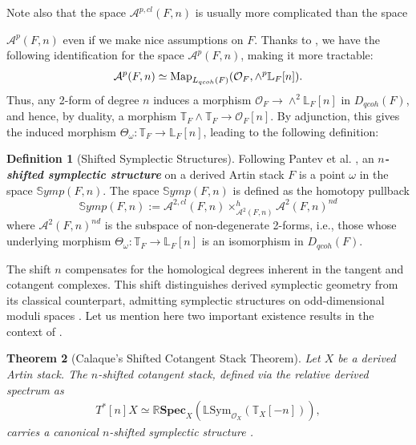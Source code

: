 \documentclass[reqno]{amsart}
\newtheorem{theorem}{Theorem}[section]
\theoremstyle{definition}
\newtheorem{definition}[theorem]{Definition}
\theoremstyle{remark}
\newcommand{\LL}{\mathbb{L}}
\newcommand{\TT}{\mathbb{T}}
\newcommand{\cO}{\mathcal{O}}
\newcommand{\bfem}[1]{\textbf{\textit{#1}}}
\begin{document}
Note also that the space $\mathcal{A}^{p,cl}(F,n)$  is usually more complicated than the space {$ \mathcal{A}^p(F,n)$  even if we make nice assumptions on $F$. Thanks to \cite[Prop.  1.14]{PTVV}, we have the following identification for the space $ \mathcal{A}^p(F,n)$, making it more tractable: 
\begin{equation*}
    \mathcal{A}^p(F,n)\simeq {\rm Map}_{L_{qcoh}(F)}(\mathcal{O}_F, \wedge^p\mathbb{L}_F[n]). 
\end{equation*}
 Thus, any 2-form of degree $n$  induces a morphism $\mathcal{O}_F \rightarrow  \wedge^2\mathbb{L}_F[n]$ in $D_{qcoh}(F)$, and hence, by duality, a morphism $\mathbb{T}_F \wedge \mathbb{T}_F \rightarrow \mathcal{O}_F[n]$. By adjunction, this gives the induced morphism $\Theta_{\omega} : \mathbb{T}_F \rightarrow \mathbb{L}_F [n]$, leading to the following definition:

\begin{definition}[Shifted Symplectic Structures]
  Following Pantev et al. \cite[Definition 1.18]{PTVV}, an
  \bfem{$n$-shifted symplectic structure} on a derived Artin stack
  $F$ is a point $\omega$ in the space $\mathbb{S}ymp(F, n)$. The
  space $\mathbb{S}ymp(F, n)$ is defined as the homotopy pullback
  \begin{equation*}
    \mathbb{S}ymp(F,n) := \mathcal{A}^{2,cl}(F,n)
    \times_{\mathcal{A}^2(F,n)}^h \mathcal{A}^2(F,n)^{nd}
  \end{equation*}
  where $\mathcal{A}^2(F,n)^{nd}$ is the subspace of non-degenerate
  2-forms, i.e., those whose underlying morphism $\Theta_{\omega}:
  \TT_F \to \LL_F[n]$ is an isomorphism in $D_{qcoh}(F)$.
\end{definition}

The shift $n$ compensates for the homological
degrees inherent in the tangent and cotangent complexes. This shift
distinguishes derived symplectic
geometry from its classical counterpart, admitting symplectic
structures on odd-dimensional moduli spaces \cite[Section 1.2]{PTVV}. 
Let us mention here two important existence results in the context of \cite{PTVV}.

\begin{theorem}[Calaque's Shifted Cotangent Stack Theorem] \label{thm:calaque}
  Let $X$ be a derived Artin stack. The $n$-shifted cotangent stack,
  defined via the relative derived spectrum as
  \begin{align*}
    T^*[n]X
    \simeq\mathbb{R}\mathbf{Spec}_X(\mathbb{L}\mathrm{Sym}_{\cO_X}(\TT_X[-n])),
  \end{align*}
  carries a canonical $n$-shifted symplectic structure \cite[Theorem
  2.2]{Calaque}.
\end{theorem}

}
\end{document}
